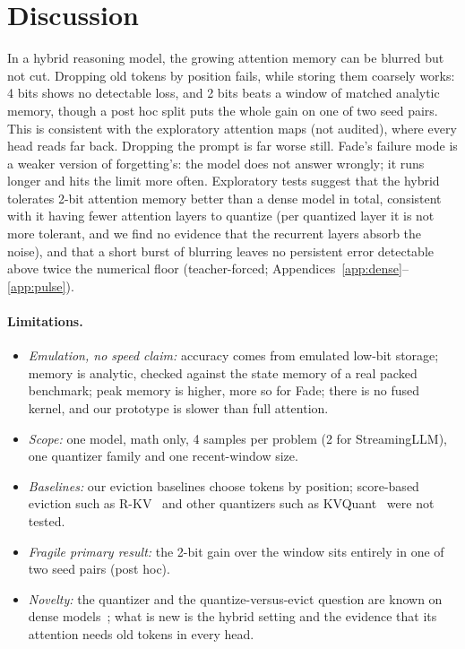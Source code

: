 \documentclass{article}
\begin{document}
\vspace{-0.6em}
\section{Discussion}
\vspace{-0.4em}
In a hybrid reasoning model, the growing attention memory can be blurred but not cut. Dropping old tokens by position fails, while storing them coarsely works: 4 bits shows no detectable loss, and 2 bits beats a window of matched analytic memory, though a post hoc split puts the whole gain on one of two seed pairs. This is consistent with the exploratory attention maps (not audited), where every head reads far back. Dropping the prompt is far worse still. Fade's failure mode is a weaker version of forgetting's: the model does not answer wrongly; it runs longer and hits the limit more often. Exploratory tests suggest that the hybrid tolerates 2-bit attention memory better than a dense model in total, consistent with it having fewer attention layers to quantize (per quantized layer it is not more tolerant, and we find no evidence that the recurrent layers absorb the noise), and that a short burst of blurring leaves no persistent error detectable above twice the numerical floor (teacher-forced; Appendices~\ref{app:dense}--\ref{app:pulse}).

\paragraph{Limitations.}
\begin{itemize}\setlength{\itemsep}{1pt}\setlength{\topsep}{0pt}
\item \emph{Emulation, no speed claim:} accuracy comes from emulated low-bit storage; memory is analytic, checked against the state memory of a real packed benchmark; peak memory is higher, more so for Fade; there is no fused kernel, and our prototype is slower than full attention.
\item \emph{Scope:} one model, math only, 4 samples per problem (2 for StreamingLLM), one quantizer family and one recent-window size.
\item \emph{Baselines:} our eviction baselines choose tokens by position; score-based eviction such as R-KV~\cite{rkv} and other quantizers such as KVQuant~\cite{kvquant} were not tested.
\item \emph{Fragile primary result:} the 2-bit gain over the window sits entirely in one of two seed pairs (post hoc).
\item \emph{Novelty:} the quantizer and the quantize-versus-evict question are known on dense models~\cite{kivi,breadthkv}; what is new is the hybrid setting and the evidence that its attention needs old tokens in every head.
\end{itemize}
\end{document}
